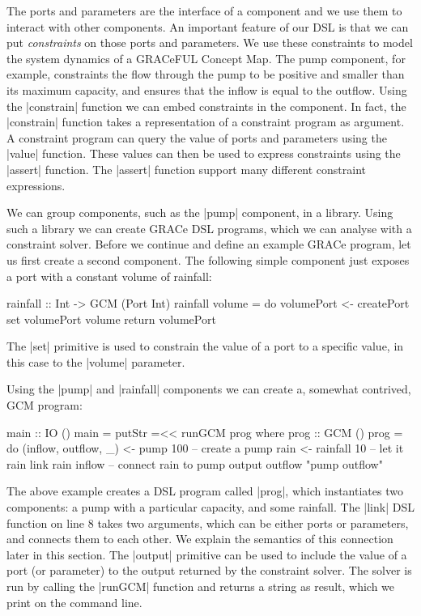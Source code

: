 \documentclass{article}
\begin{document}
The ports and parameters are the interface of a component and we use
them to interact with other components.
%
An important feature of our DSL is that we can put \emph{constraints}
on those ports and parameters.
%
We use these constraints to model the system dynamics of a GRACeFUL
Concept Map.
%
The pump component, for example, constraints the flow through the pump
to be positive and smaller than its maximum capacity, and ensures that
the inflow is equal to the outflow.
%
Using the |constrain| function we can embed constraints in the
component.
%
In fact, the |constrain| function takes a representation of a
constraint program as argument.
%
A constraint program can query the value of ports and parameters using
the |value| function.
%
These values can then be used to express constraints using the
|assert| function.
%
The |assert| function support many different constraint expressions.

We can group components, such as the |pump| component, in a library.
%
Using such a library we can create GRACe DSL programs, which we can
analyse with a constraint solver.
%
Before we continue and define an example GRACe program, let us first
create a second component.
%
The following simple component just exposes a port with a constant
volume of rainfall:
%
\begin{haskellcode}
rainfall :: Int -> GCM (Port Int)
rainfall volume = do
  volumePort <- createPort
  set volumePort volume
  return volumePort
\end{haskellcode}
%
The |set| primitive is used to constrain the value of a port to a
specific value, in this case to the |volume| parameter.

Using the |pump| and |rainfall| components we can create a, somewhat
contrived, \ac{GCM} program:
%
\begin{haskellcode}
main :: IO ()
main = putStr =<< runGCM prog
  where
    prog :: GCM ()
    prog = do
      (inflow, outflow, _) <- pump 100  -- create a pump
      rain <- rainfall 10               -- let it rain
      link rain inflow                  -- connect rain to pump
      output outflow "pump outflow"
\end{haskellcode}
%
The above example creates a DSL program called |prog|, which
instantiates two components: a pump with a particular capacity, and
some rainfall.
%
The |link| DSL function on line 8 takes two arguments, which can be
either ports or parameters, and connects them to each other.
%
We explain the semantics of this connection later in this section.
%
The |output| primitive can be used to include the value of a port (or
parameter) to the output returned by the constraint solver.
%
The solver is run by calling the |runGCM| function and returns a
string as result, which we print on the command line.
\end{document}
